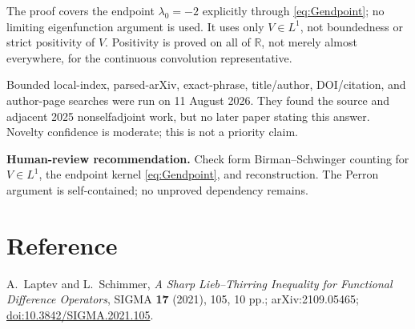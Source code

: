 \documentclass[11pt]{article}
\newcommand{\R}{\mathbb R}
\begin{document}
The proof covers the endpoint $\lambda_0=-2$ explicitly through
\eqref{eq:Gendpoint}; no limiting eigenfunction argument is used.  It uses
only $V\in L^1$, not boundedness or strict positivity of $V$.  Positivity is
proved on all of $\R$, not merely almost everywhere, for the continuous
convolution representative.

Bounded local-index, parsed-arXiv, exact-phrase, title/author, DOI/citation,
and author-page searches were run on 11 August 2026.  They found the source
and adjacent 2025 nonselfadjoint work, but no later paper stating this answer.
Novelty confidence is moderate; this is not a priority claim.

\textbf{Human-review recommendation.}  Check form Birman--Schwinger counting
for $V\in L^1$, the endpoint kernel \eqref{eq:Gendpoint}, and reconstruction.
The Perron argument is self-contained; no unproved dependency remains.

\section*{Reference}
\small
\noindent [1] A.~Laptev and L.~Schimmer,
\emph{A Sharp Lieb--Thirring Inequality for Functional Difference Operators},
SIGMA \textbf{17} (2021), 105, 10 pp.; arXiv:2109.05465;
\href{https://doi.org/10.3842/SIGMA.2021.105}{doi:10.3842/SIGMA.2021.105}.
\end{document}
